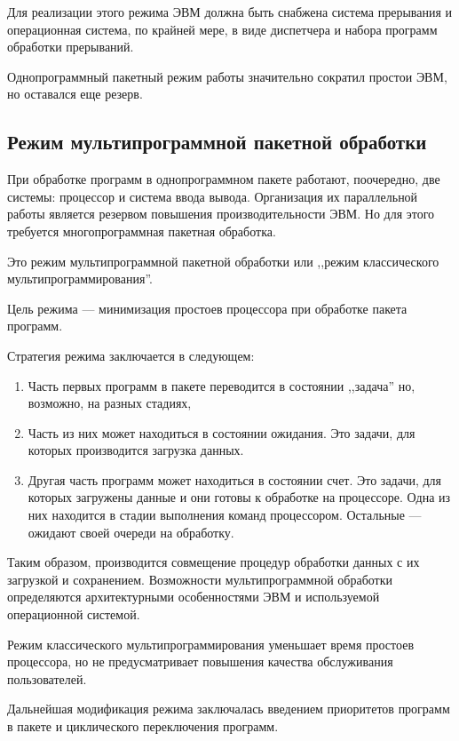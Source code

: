 \documentclass[a4paper, 10pt, notitlepage, pdftex,headsepline]{scrartcl}
\begin{document}
    Для реализации этого режима ЭВМ должна быть снабжена система
    прерывания и операционная система, по крайней мере, в виде
    диспетчера и набора программ обработки прерываний.

    Однопрограммный пакетный режим работы значительно сократил простои
    ЭВМ, но оставался еще резерв.
  \subsection{Режим мультипрограммной пакетной обработки}
    При обработке программ в однопрограммном пакете работают,
    поочередно, две системы: процессор и система ввода вывода.
    Организация их параллельной работы является резервом повышения
    производительности ЭВМ. Но для этого требуется многопрограммная
    пакетная обработка.

    Это режим мультипрограммной пакетной обработки или ,,режим
    классического мультипрограммирования''.

    Цель режима --- минимизация простоев процессора при обработке пакета
    программ.

    Стратегия режима заключается в следующем:
    \begin{enumerate}
      \item Часть первых программ в пакете переводится в состоянии
        ,,задача'' но, возможно, на разных стадиях,
      \item Часть из них может находиться в состоянии ожидания.
        Это задачи, для которых производится загрузка данных.
      \item Другая часть программ может находиться в состоянии счет.
        Это задачи, для которых загружены данные и они готовы к
        обработке на процессоре.
        Одна из них находится в стадии выполнения команд процессором.
        Остальные --- ожидают своей очереди на обработку.
    \end{enumerate}

    Таким образом, производится совмещение процедур обработки данных с
    их загрузкой и сохранением.
    Возможности мультипрограммной обработки определяются архитектурными
    особенностями ЭВМ и используемой операционной системой.

    Режим классического мультипрограммирования уменьшает время простоев
    процессора, но не предусматривает повышения качества обслуживания
    пользователей.

    Дальнейшая модификация режима заключалась введением приоритетов
    программ в пакете и циклического переключения программ.
\end{document}
